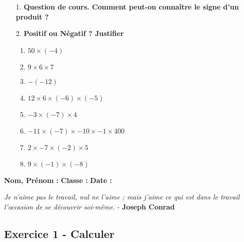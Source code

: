 \documentclass[11pt]{article}
\newcommand{\Pointilles}[1][3]{%
  \multido{}{#1}{\makebox[\linewidth]{\dotfill}\\[\parskip]
}}
\begin{document}
\begin{enumerate}
    \item[1.] \textbf{Question de cours. Comment peut-on connaître le signe d'un produit ?} \\
    \Pointilles[3]

    \item[2.] \textbf{Positif ou Négatif ? Justifier} 
    \begin{enumerate}
        \item $50 \times (-4)$ \dotfill
        \item $9 \times 6 \times 7$ \dotfill
        \item $ -(-12)$ \dotfill
        \item $12 \times 6 \times (-6) \times (-5)$ \dotfill
        \item $-3 \times (-7) \times 4$ \dotfill
        \item $-11 \times (-7) \times -10 \times -1 \times 400$ \dotfill
        \item $2 \times -7 \times (-2) \times 5$ \dotfill
        \item $9 \times (-1) \times (-8)$ \dotfill
    \end{enumerate}
\end{enumerate}

\newpage

\textbf{Nom, Prénom :} \hspace{8cm} \textbf{Classe :} \hspace{3cm} \textbf{Date :}\\
\vspace{-0.8cm}
\begin{center}
  \textit{Je n'aime pas le travail, nul ne l'aime ; mais j'aime ce qui est dans le travail l'occasion de se découvrir soi-même.}  - \textbf{Joseph Conrad}
\end{center}
\vspace{-0.8cm}

\subsection*{Exercice 1 - Calculer}
\end{document}
